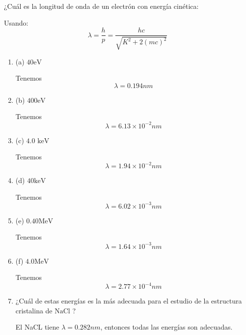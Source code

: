 \begin{problema}
    ¿Cuál es la longitud de onda de un electrón con energía cinética:
    \begin{cajita}
        Usando: 
        $$\lambda =\frac{h}{p}=\frac{hc}{\sqrt{K^2+2(mc)^2}}$$
    \end{cajita}
    \begin{enumerate}
        \item (a) $40 \mathrm{eV}$
        \begin{sol}
            Tenemos 
            $$\lambda = 0.194 nm$$
        \end{sol}
        \item (b) $400 \mathrm{eV}$
        \begin{sol}
            Tenemos 
            $$\lambda = 6.13\times 10^{-2} nm$$
        \end{sol}
        \item (c) $4.0$ $\mathrm{keV}$
        \begin{sol}
            Tenemos 
            $$\lambda = 1.94\times 10^{-2} nm$$
        \end{sol}
        \item (d) $40 \mathrm{keV}$
        \begin{sol}
            Tenemos 
            $$\lambda = 6.02\times 10^{-3} nm$$
        \end{sol}
        \item (e) $0.40 \mathrm{MeV}$
        \begin{sol}
            Tenemos 
            $$\lambda = 1.64\times 10^{-3} nm$$
        \end{sol}
        \item (f) $4.0 \mathrm{MeV}$
        \begin{sol}
            Tenemos 
            $$\lambda = 2.77\times 10^{-4} nm$$
        \end{sol}
        \item ¿Cuál de estas energías es la más adecuada para el estudio de la estructura cristalina de $\mathrm{NaCl}$ ?
        \begin{sol}
            El NaCL tiene $\lambda=0.282 nm$, entonces todas las energías son adecuadas. 
        \end{sol}
    \end{enumerate}


\end{problema}


